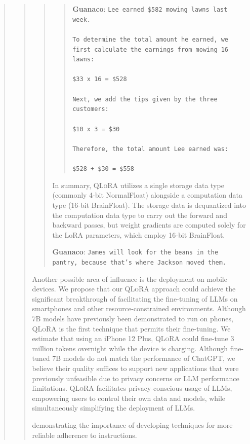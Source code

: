 \begin{quote}
\begin{quote}
\begin{quote}
\begin{quote}
    \textbf{Guanaco}: \texttt{Lee earned \$582 mowing lawns last week. \\ \\ To determine the total amount he earned, we first calculate the earnings from mowing 16 lawns: \\ \\  \$33 x 16 = \$528 \\ \\ Next, we add the tips given by the three customers: \\  \\ \$10 x 3 = \$30 \\ \\ Therefore, the total amount Lee earned was: \\ \\ \$528 + \$30 = \$558}
\end{quote}

In summary, \textsc{QLoRA} utilizes a single storage data type (commonly 4-bit NormalFloat) alongside a computation data type (16-bit BrainFloat). The storage data is dequantized into the computation data type to carry out the forward and backward passes, but weight gradients are computed solely for the LoRA parameters, which employ 16-bit BrainFloat.

    \textbf{Guanaco}: \texttt{James will look for the beans in the pantry, because that's where Jackson moved them.}
\end{quote}

Another possible area of influence is the deployment on mobile devices. We propose that our \textsc{QLoRA} approach could achieve the significant breakthrough of facilitating the fine-tuning of LLMs on smartphones and other resource-constrained environments. Although 7B models have previously been demonstrated to run on phones, \textsc{QLoRA} is the first technique that permits their fine-tuning. We estimate that using an iPhone 12 Plus, \textsc{QLoRA} could fine-tune 3 million tokens overnight while the device is charging. Although fine-tuned 7B models do not match the performance of ChatGPT, we believe their quality suffices to support new applications that were previously unfeasible due to privacy concerns or LLM performance limitations. \textsc{QLoRA} facilitates privacy-conscious usage of LLMs, empowering users to control their own data and models, while simultaneously simplifying the deployment of LLMs.

demonstrating the importance of developing techniques for more reliable adherence to instructions.


\end{quote}
\end{quote}
